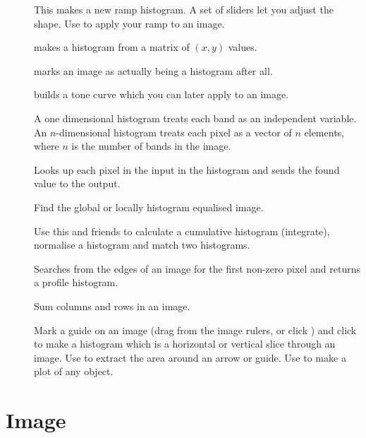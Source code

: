\begin{description}

\item[]
	This makes a new ramp histogram. A set of sliders let you adjust the
	shape. Use  to apply your ramp to an image.

	 makes a histogram from a matrix of 
	$(x, y)$ values. 

	 marks an image as actually being a 
	histogram after all.

	 builds a tone curve which you can later apply to an
	image.

\item[]
	A one dimensional histogram treats each band as an independent
	variable. An $n$-dimensional histogram treats each pixel as a vector of
	$n$ elements, where $n$ is the number of bands in the image.

\item[]
	Looks up each pixel in the input in the histogram and sends the found
	value to the output.

\item[]
	Find the global or locally histogram equalised image.

\item[]
	Use this and friends to calculate a cumulative histogram (integrate), 
	normalise a histogram and match two histograms. 

\item[]
	Searches from the edges of an image for the first non-zero pixel and
	returns a profile histogram. 

\item[]
	Sum columns and rows in an image.

\item[]
	Mark a guide on an image (drag from the
	image rulers, or click ) and click 
	 to make a histogram which is a horizontal or vertical 
	slice through an image. Use  to extract the area
	around an arrow or guide. Use  to make a plot of any
	object.

\end{description}

\section{Image}

